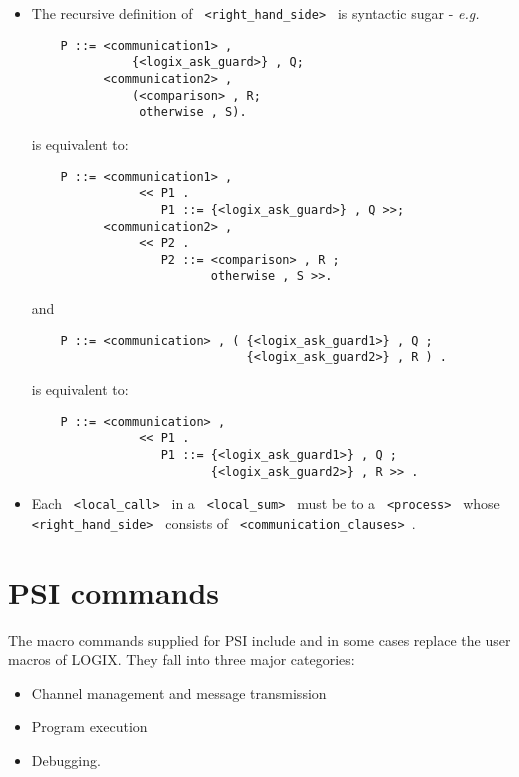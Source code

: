 \begin{itemize}
\item
The recursive definition of \verb+ <right_hand_side> + is syntactic
sugar - {\em e.g.}

\begin{verbatim}
    P ::= <communication1> ,
              {<logix_ask_guard>} , Q;
          <communication2> ,
              (<comparison> , R;
               otherwise , S).
\end{verbatim}

\noindent
is equivalent to:

\begin{verbatim}
    P ::= <communication1> ,
               << P1 .
                  P1 ::= {<logix_ask_guard>} , Q >>;
          <communication2> ,
               << P2 .
                  P2 ::= <comparison> , R ;
                         otherwise , S >>.
\end{verbatim}

\noindent
and

\begin{verbatim}
    P ::= <communication> , ( {<logix_ask_guard1>} , Q ;
                              {<logix_ask_guard2>} , R ) .
\end{verbatim}

\noindent
is equivalent to:

\begin{verbatim}
    P ::= <communication> , 
               << P1 .
                  P1 ::= {<logix_ask_guard1>} , Q ;
                         {<logix_ask_guard2>} , R >> .
\end{verbatim}


\item
Each \verb+ <local_call> + in a \verb+ <local_sum> + must be to a 
\verb+ <process> + whose \verb+ <right_hand_side> + consists of
\verb+ <communication_clauses> +.

\end{itemize}

\chapter{PSI commands}
\label{commands}

The macro commands supplied for PSI include and in some cases replace
the user macros of LOGIX.  They fall into three major
categories:

\begin{itemize}
\item Channel management and message transmission
\item Program execution
\item Debugging.
\end{itemize}

